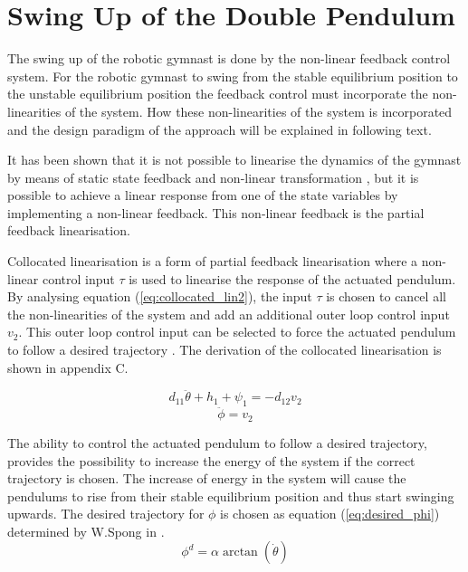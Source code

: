 \documentclass[a4paper,12pt]{article}
\begin{document}
	
	
	\section{Swing Up of the Double Pendulum}
	The swing up of the robotic gymnast is done by the non-linear feedback control system. For the robotic gymnast to swing from the stable equilibrium position to the unstable equilibrium position the feedback control must incorporate the non-linearities of the system. How these non-linearities of the system is incorporated and the design paradigm of the approach will be explained in following text.
	
	It has been shown that it is not possible to linearise the dynamics of the gymnast by means of static state feedback and non-linear transformation \cite{murray}, but it is possible to achieve a linear response from one of the state variables by implementing a non-linear feedback. This non-linear feedback is the partial feedback linearisation.
	
	Collocated linearisation is a form of partial feedback linearisation where a non-linear control input $\tau$ is used to linearise the response of the actuated pendulum. By analysing equation (\ref{eq:collocated_lin2}), the input $\tau$ is chosen to cancel all the non-linearities of the system and add an additional outer loop control input $v_{2}$. This outer loop control input can be selected to force the actuated pendulum to follow a desired trajectory \cite{spong_swingup}. The derivation of the collocated linearisation is shown in appendix C.
	
	\begin{equation} \label{eq:collocated_lin1}
	d_{11}\ddot{\theta} + h_{1} + \psi_{1} = -d_{12}v_{2}
	\end{equation}
	\begin{equation} \label{eq:collocated_lin2}
	\ddot{\phi} = v_{2}
	\end{equation}
	
	The ability to control the actuated pendulum to follow a desired trajectory, provides the possibility to increase the energy of the system if the correct trajectory is chosen. The increase of energy in the system will cause the pendulums to rise from their stable equilibrium position and thus start swinging upwards. The desired trajectory for ${\phi}$ is chosen as equation (\ref{eq:desired_phi}) determined by W.Spong in \cite{spong_swingup}.
	\begin{equation} \label{eq:desired_phi}
	\phi^{d} =  \alpha \arctan(\dot{\theta})
	\end{equation}
	
\end{document}
